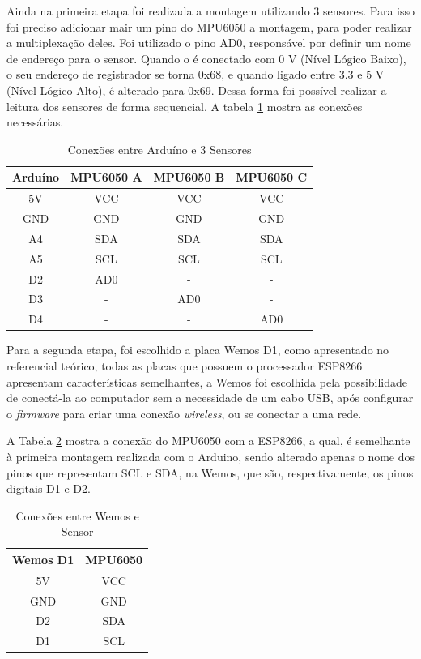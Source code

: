 		Ainda na primeira etapa foi realizada a montagem utilizando 3 sensores.  Para isso foi preciso adicionar mair um pino do MPU6050 a montagem, para poder realizar a multiplexação deles. Foi utilizado o pino AD0, responsável por definir um nome de endereço para o sensor. Quando o é conectado com 0 V (Nível Lógico Baixo), o seu endereço de registrador se torna 0x68, e quando ligado entre 3.3 e 5 V (Nível Lógico Alto), é alterado para 0x69.  Dessa forma foi possível realizar a leitura dos sensores de forma sequencial. A tabela \ref{conexoes_mult} mostra as conexões necessárias.
		
		 	\begin{table}[h!] \footnotesize
		 	\centering
		 	\caption{Conexões entre Arduíno e 3 Sensores }
		 	\label{conexoes_mult}
		 	
		 	\begin{tabular}{cccc}
		 		\toprule
		 		\textbf{Arduíno} & \textbf{MPU6050 A} & \textbf{MPU6050 B} & \textbf{MPU6050 C} \\
		 		\midrule
		 		5V & VCC & VCC & VCC  \\
		 		GND & GND & GND & GND\\
		 		A4 & SDA & SDA & SDA  \\
		 		A5 & SCL & SCL & SCL \\
		 		D2 & AD0 & - & - \\
		 		D3 & - & AD0 & - \\
		 		D4 & - & - & AD0 \\
		 		\bottomrule
		 	\end{tabular}
		 \end{table}
	 
	 Para a segunda etapa, foi escolhido a placa Wemos D1,  como apresentado no referencial teórico, todas as placas que possuem o processador ESP8266 apresentam características  semelhantes, a Wemos foi escolhida pela possibilidade de conectá-la ao computador sem a necessidade de um cabo USB, após configurar o \textit{firmware} para criar uma conexão \textit{wireless}, ou se conectar a uma rede. 
	 
	 A Tabela \ref{conexoes_esp} mostra a conexão do MPU6050 com a ESP8266, a qual,  é semelhante à primeira montagem realizada com o Arduino, sendo alterado apenas o nome dos pinos que representam SCL e SDA, na Wemos, que são, respectivamente, os pinos digitais D1 e D2.
	  
	 \begin{table}[h!] \footnotesize
	 	\centering
	 	\caption{Conexões entre Wemos e Sensor  }
	 	\label{conexoes_esp}
	 	
	 	\begin{tabular}{cc}
	 		\toprule
	 		\textbf{Wemos D1} & \textbf{MPU6050} \\
	 		\midrule
	 		5V & VCC \\
	 		GND & GND \\
	 		D2  & SDA  \\
	 		D1 & SCL \\
	 		\bottomrule
	 	\end{tabular}
	 \end{table}
 
